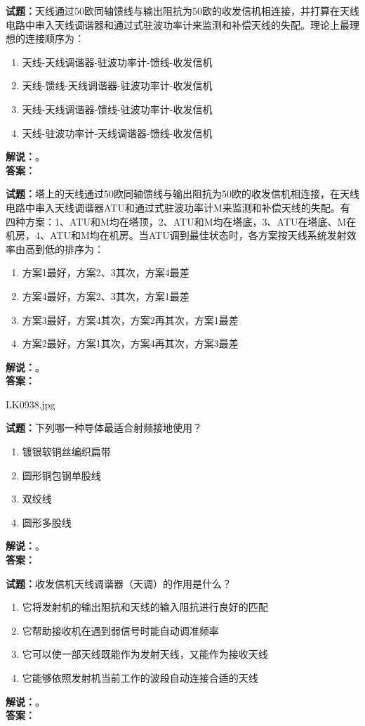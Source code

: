 \documentclass{ctexbook}
\begin{document}
\bigskip

\noindent\textbf{试题：}天线通过50欧同轴馈线与输出阻抗为50欧的收发信机相连接，并打算在天线电路中串入天线调谐器和通过式驻波功率计来监测和补偿天线的失配。理论上最理想的连接顺序为：
\begin{enumerate}[leftmargin=3em]
  \item 天线-天线调谐器-驻波功率计-馈线-收发信机
  \item 天线-馈线-天线调谐器-驻波功率计-收发信机
  \item 天线-天线调谐器-馈线-驻波功率计-收发信机
  \item 天线-驻波功率计-天线调谐器-馈线-收发信机
\end{enumerate}
\noindent\textbf{解说：}\textbf{}。\\\noindent\textbf{答案：}

\bigskip

\noindent\textbf{试题：}塔上的天线通过50欧同轴馈线与输出阻抗为50欧的收发信机相连接，在天线电路中串入天线调谐器ATU和通过式驻波功率计M来监测和补偿天线的失配。有四种方案：1、ATU和M均在塔顶，2、ATU和M均在塔底，3、ATU在塔底、M在机房，4、ATU和M均在机房。当ATU调到最佳状态时，各方案按天线系统发射效率由高到低的排序为：
\begin{enumerate}[leftmargin=3em]
  \item 方案1最好，方案2、3其次，方案4最差
  \item 方案4最好，方案2、3其次，方案1最差
  \item 方案3最好，方案4其次，方案2再其次，方案1最差
  \item 方案2最好，方案1其次，方案4再其次，方案3最差
\end{enumerate}
\noindent\textbf{解说：}\textbf{}。\\\noindent\textbf{答案：}

\bigskip

LK0938.jpg

\noindent\textbf{试题：}下列哪一种导体最适合射频接地使用？
\begin{enumerate}[leftmargin=3em]
  \item 镀银软铜丝编织扁带
  \item 圆形铜包钢单股线
  \item 双绞线
  \item 圆形多股线
\end{enumerate}
\noindent\textbf{解说：}\textbf{}。\\\noindent\textbf{答案：}

\bigskip

\noindent\textbf{试题：}收发信机天线调谐器（天调）的作用是什么？
\begin{enumerate}[leftmargin=3em]
  \item 它将发射机的输出阻抗和天线的输入阻抗进行良好的匹配
  \item 它帮助接收机在遇到弱信号时能自动调准频率
  \item 它可以使一部天线既能作为发射天线，又能作为接收天线
  \item 它能够依照发射机当前工作的波段自动连接合适的天线
\end{enumerate}
\noindent\textbf{解说：}\textbf{}。\\\noindent\textbf{答案：}
\end{document}
